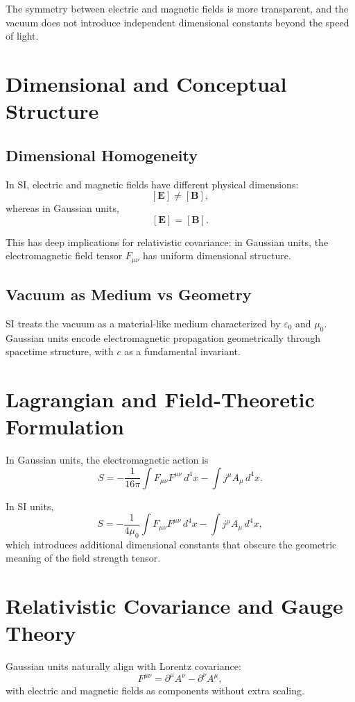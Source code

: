 \documentclass[aps,prd,preprint,superscriptaddress,nofootinbib]{revtex4-2}
\begin{document}
The symmetry between electric and magnetic fields is more transparent, and the vacuum does not introduce independent dimensional constants beyond the speed of light.

\section{Dimensional and Conceptual Structure}

\subsection{Dimensional Homogeneity}

In SI, electric and magnetic fields have different physical dimensions:
\[
[\mathbf{E}] \neq [\mathbf{B}],
\]
whereas in Gaussian units,
\[
[\mathbf{E}] = [\mathbf{B}].
\]

This has deep implications for relativistic covariance: in Gaussian units, the electromagnetic field tensor $F_{\mu\nu}$ has uniform dimensional structure.

\subsection{Vacuum as Medium vs Geometry}

SI treats the vacuum as a material-like medium characterized by $\varepsilon_0$ and $\mu_0$. Gaussian units encode electromagnetic propagation geometrically through spacetime structure, with $c$ as a fundamental invariant.

\section{Lagrangian and Field-Theoretic Formulation}

In Gaussian units, the electromagnetic action is
\[
S = -\frac{1}{16\pi} \int F_{\mu\nu}F^{\mu\nu} \, d^4x - \int j^\mu A_\mu \, d^4x.
\]

In SI units,
\[
S = -\frac{1}{4\mu_0} \int F_{\mu\nu}F^{\mu\nu} \, d^4x - \int j^\mu A_\mu \, d^4x,
\]
which introduces additional dimensional constants that obscure the geometric meaning of the field strength tensor.

\section{Relativistic Covariance and Gauge Theory}

Gaussian units naturally align with Lorentz covariance:
\[
F^{\mu\nu} = \partial^\mu A^\nu - \partial^\nu A^\mu,
\]
with electric and magnetic fields as components without extra scaling.
\end{document}
